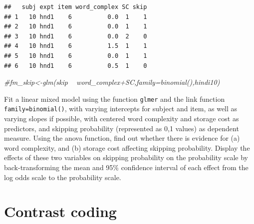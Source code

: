 \documentclass[12pt,]{krantz}
\newenvironment{Shaded}{\begin{snugshade}}{\end{snugshade}}
\newcommand{\CommentTok}[1]{\textcolor[rgb]{0.56,0.35,0.01}{\textit{#1}}}
\newcommand{\DataTypeTok}[1]{\textcolor[rgb]{0.13,0.29,0.53}{#1}}
\newcommand{\DecValTok}[1]{\textcolor[rgb]{0.00,0.00,0.81}{#1}}
\newcommand{\KeywordTok}[1]{\textcolor[rgb]{0.13,0.29,0.53}{\textbf{#1}}}
\newcommand{\NormalTok}[1]{#1}
\newcommand{\OperatorTok}[1]{\textcolor[rgb]{0.81,0.36,0.00}{\textbf{#1}}}
\newcommand{\OtherTok}[1]{\textcolor[rgb]{0.56,0.35,0.01}{#1}}
\newcommand{\StringTok}[1]{\textcolor[rgb]{0.31,0.60,0.02}{#1}}
\begin{document}
\begin{Shaded}
\end{Shaded}

\begin{verbatim}
##   subj expt item word_complex SC skip
## 1   10 hnd1    6          0.0  1    1
## 2   10 hnd1    6          0.0  1    1
## 3   10 hnd1    6          0.0  2    0
## 4   10 hnd1    6          1.5  1    1
## 5   10 hnd1    6          0.0  1    1
## 6   10 hnd1    6          0.5  1    0
\end{verbatim}

\begin{Shaded}
\begin{Highlighting}[]
\CommentTok{#fm_skip<-glm(skip ~ word_complex+SC,family=binomial(),hindi10)}
\end{Highlighting}
\end{Shaded}

Fit a linear mixed model using the function \texttt{glmer} and the link function \texttt{family=binomial()}, with varying intercepts for subject and item, as well as varying slopes if possible, with centered word complexity and storage cost as predictors, and skipping probability (represented as 0,1 values) as dependent measure. Using the anova function, find out whether there is evidence for (a) word complexity, and (b) storage cost affecting skipping probability. Display the effects of these two variables on skipping probability on the probability scale by back-transforming the mean and 95\% confidence interval of each effect from the log odds scale to the probability scale.

\hypertarget{ch:contr}{%
\chapter{Contrast coding}\label{ch:contr}}
\end{document}
